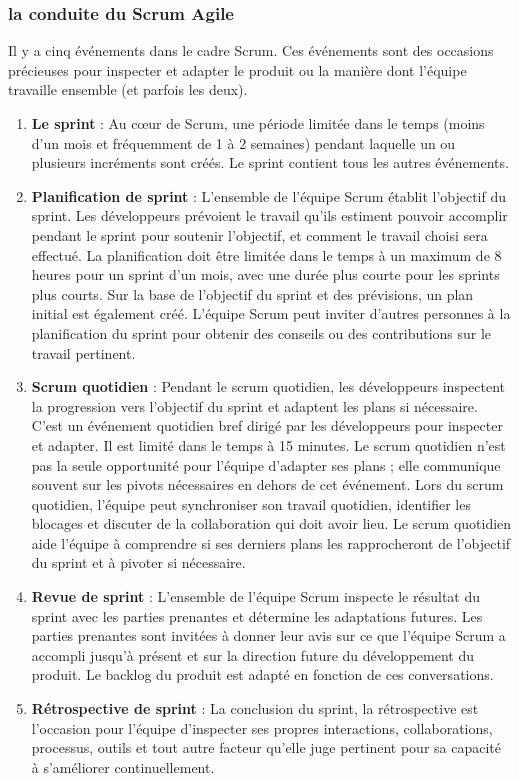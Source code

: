 \subsubsection{la conduite du Scrum Agile}
Il y a cinq événements dans le cadre Scrum. Ces événements sont des occasions précieuses pour inspecter et adapter le produit ou la manière dont l'équipe travaille ensemble (et parfois les deux).
\begin{enumerate} %
    \item \textbf{Le sprint} : Au cœur de Scrum, une période limitée dans le temps (moins d'un mois et fréquemment de 1 à 2 semaines) pendant laquelle un ou plusieurs incréments sont créés. Le sprint contient tous les autres événements.
    \item \textbf{Planification de sprint} : L'ensemble de l'équipe Scrum établit l'objectif du sprint. Les développeurs prévoient le travail qu'ils estiment pouvoir accomplir pendant le sprint pour soutenir l'objectif, et comment le travail choisi sera effectué. La planification doit être limitée dans le temps à un maximum de 8 heures pour un sprint d'un mois, avec une durée plus courte pour les sprints plus courts. Sur la base de l'objectif du sprint et des prévisions, un plan initial est également créé. L'équipe Scrum peut inviter d'autres personnes à la planification du sprint pour obtenir des conseils ou des contributions sur le travail pertinent.
    \item \textbf{Scrum quotidien} : Pendant le scrum quotidien, les développeurs inspectent la progression vers l'objectif du sprint et adaptent les plans si nécessaire. C'est un événement quotidien bref dirigé par les développeurs pour inspecter et adapter. Il est limité dans le temps à 15 minutes. Le scrum quotidien n'est pas la seule opportunité pour l'équipe d'adapter ses plans ; elle communique souvent sur les pivots nécessaires en dehors de cet événement. Lors du scrum quotidien, l'équipe peut synchroniser son travail quotidien, identifier les blocages et discuter de la collaboration qui doit avoir lieu. Le scrum quotidien aide l'équipe à comprendre si ses derniers plans les rapprocheront de l'objectif du sprint et à pivoter si nécessaire.
    \item \textbf{Revue de sprint} : L'ensemble de l'équipe Scrum inspecte le résultat du sprint avec les parties prenantes et détermine les adaptations futures. Les parties prenantes sont invitées à donner leur avis sur ce que l'équipe Scrum a accompli jusqu'à présent et sur la direction future du développement du produit. Le backlog du produit est adapté en fonction de ces conversations.
    \item \textbf{Rétrospective de sprint} : La conclusion du sprint, la rétrospective est l'occasion pour l'équipe d'inspecter ses propres interactions, collaborations, processus, outils et tout autre facteur qu'elle juge pertinent pour sa capacité à s'améliorer continuellement.
\end{enumerate}
\cite*{scrumalliance}
